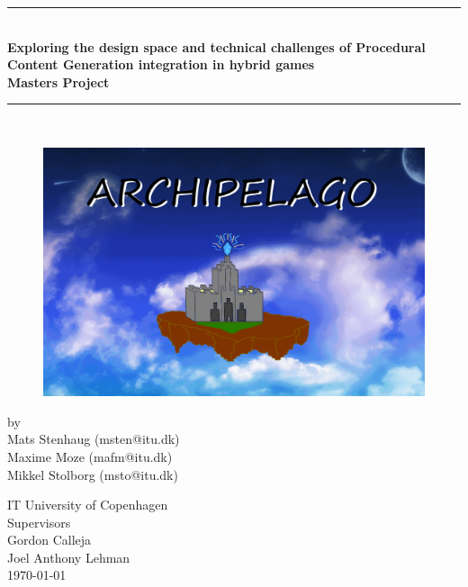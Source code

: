 \documentclass[a4paper,11pt]{report}
\begin{document}
\lstset{language=C}
 
\begin{titlepage}

\centering \parindent=0pt
\newcommand{\HRule}{\rule{\textwidth}{1mm}}
 \HRule\\[1cm]\large\bfseries
Exploring the design space and technical challenges of Procedural Content Generation integration in hybrid games\\[0.7cm]
\large Masters Project\\[1cm]
\HRule\\[1cm]

\begin{figure}[!ht]
	\centering
    \includegraphics[width=1\textwidth]{Images/LOGO.png}
    \label{fig:frontPage}
\end{figure}
\large by 
\\Mats Stenhaug (msten@itu.dk)
\\Maxime Moze (mafm@itu.dk)
\\Mikkel Stolborg (msto@itu.dk)
 \normalsize
\begin{flushleft}
IT University of Copenhagen \\
Supervisors\\
Gordon Calleja\\
Joel Anthony Lehman\\
\today \end{flushleft}
\end{titlepage}
\end{document}
